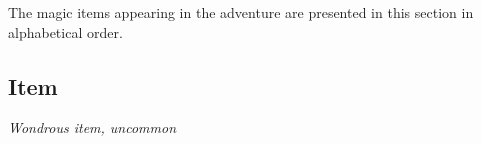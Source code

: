 \documentclass[palace_of_the_silver_princess]{subfiles}
\begin{document}
\selectfont
\clearpage


The magic items appearing in the adventure are presented in this section in alphabetical order.\\

\subsection{Item}
\textit{Wondrous item, uncommon}\\

\lipsum[1]
\end{document}
